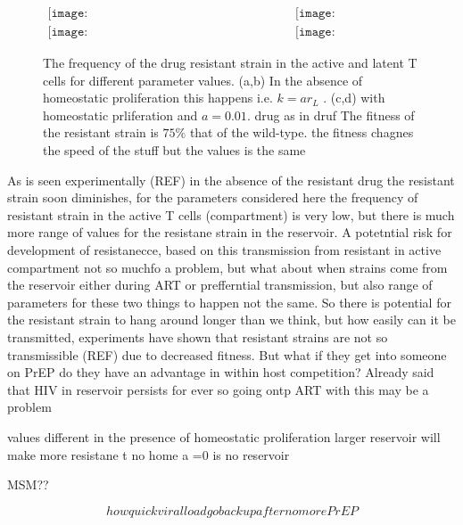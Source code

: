 \documentclass[DIV=15]{scrartcl}
\begin{document}
\begin{figure*}[h]
 \begin{center}$
 \begin{array}{cc}
 \texttt{[image: NoHomeo\_Active\_S1\_HigFit075\_09\_06b.png]} &
 \texttt{[image: NoHomeo\_Reservoir\_S1\_HigFit075\_09\_06b.png]} \\
  \texttt{[image: Homeo\_Active\_S1\_HigFit075\_09\_06b.png]} &
 \texttt{[image: Homeo\_Reservoir\_S1\_HigFit075\_09\_06b.png]}
 \end{array}$
 \end{center}
 \caption{The frequency of the drug resistant strain in the active and latent T cells for different parameter values. (a,b) In the absence of homeostatic proliferation this happens i.e. $k = ar_L$ . (c,d) with homeostatic prliferation and $a = 0.01$.  drug as in druf 
 The fitness of the resistant strain is $75\%$ that of the wild-type. the fitness chagnes  the speed  of the stuff but the values is the same  }
 \label{within host parameter sweep}
 \end{figure*} 

As is seen experimentally (REF) in the absence of the resistant drug the resistant strain soon diminishes,  for the parameters considered here the frequency of resistant strain in the active T cells (compartment) is very low, but there is much more range of values for the resistane strain in the reservoir. A potetntial risk for development 
of resistanecce, based on this transmission from resistant in active compartment not so muchfo a problem,  but what about when strains come from the reservoir either during ART or prefferntial transmission, but also  range of parameters for these two things to happen not the same. So there is potential for the resistant strain to hang around longer than we think, but how easily can it be transmitted, experiments have shown that resistant strains are not so transmissible (REF) due to decreased fitness.  But what if they get into someone on PrEP do they have an advantage in within host competition? Already said that HIV in reservoir persists for ever so going ontp ART with this may be a problem

values different in the presence of  homeostatic proliferation larger reservoir will make more resistane t
 no home a =0 is no reservoir

MSM??




$$how quick viral load go back up after no more PrEP$$
\end{document}
